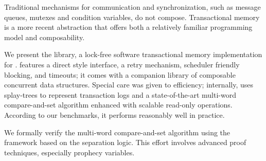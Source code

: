 Traditional mechanisms for communication and synchronization, such as message queues, mutexes and condition variables, do not compose.
Transactional memory is a more recent abstraction that offers both a relatively familiar programming model and composability.

We present the \Kcas library, a lock-free software transactional memory implementation for \OCaml.
\Kcas features a direct style interface, a retry mechanism, scheduler friendly blocking, and timeouts; it comes with a companion library of composable concurrent data structures.
Special care was given to efficiency; internally, \Kcas uses splay-trees to represent transaction logs and a state-of-the-art multi-word compare-and-set algorithm enhanced with scalable read-only operations.
According to our benchmarks, it performs reasonably well in practice.

We formally verify the multi-word compare-and-set algorithm using the \Zoo framework based on the \Iris separation logic.
This effort involves advanced proof techniques, especially prophecy variables.

